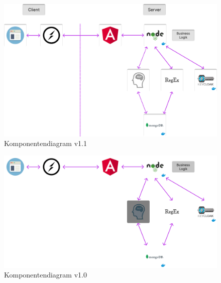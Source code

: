 \begin{figure}
\centering
\includegraphics[width=1.0\textwidth]{bilder/technologien/Komponentendiagram v1.1.png}
\caption{Komponentendiagram v1.1}
\label{fig:Komponentendiagram_v1.1}
\end{figure}

\begin{figure}
\centering
\includegraphics[width=1.0\textwidth]{bilder/technologien/Komponenten-Diagram-v1.png}
\caption{Komponentendiagram v1.0}
\label{fig:Komponentendiagram_v1.0}
\end{figure}
\FloatBarrier %